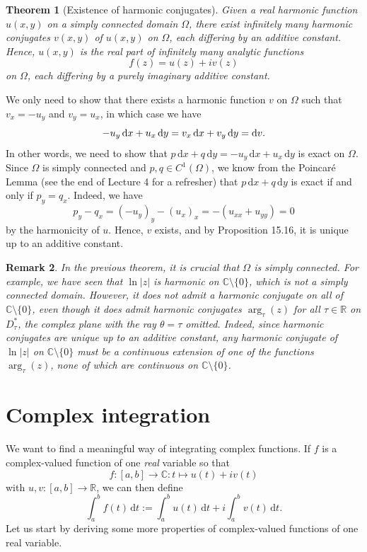 \documentclass[10pt]{article}
\makeatletter
\newcommand{\R}{\mathbb{R}}
\newcommand{\C}{\mathbb{C}}
\newcommand{\dd}{\,\mathrm{d}}
\theoremstyle{newstyle}
\newtheorem{thm}{Theorem}[section]
\newtheorem{remark}[thm]{Remark}
\newenvironment{pf}[1][\proofname]{\par
  \pushQED{\qed}%
  \normalfont \topsep0\p@\relax
  \trivlist
  \item[\hskip\labelsep\scshape
  #1\@addpunct{.}]\ignorespaces
}{%
  \popQED\endtrivlist\@endpefalse
}
\makeatother
\begin{document}
\begin{thm}[Existence of harmonic conjugates]
Given a real harmonic function $u(x, y)$ on a simply connected domain $\Omega$, there 
exist infinitely many harmonic conjugates $v(x, y)$ of $u(x, y)$ on $\Omega$, each 
differing by an additive constant. Hence, $u(x, y)$ is the real part of 
infinitely many analytic functions 
\[ f(z) = u(z) + iv(z) \]
on $\Omega$, each differing by a purely imaginary additive constant. 
\end{thm}
\begin{pf}
We only need to show that there exists a harmonic function $v$ on $\Omega$ such that 
$v_x = -u_y$ and $v_y = u_x$, in which case we have 
\[ -u_y\dd x + u_x \dd y = v_x \dd x + v_y \dd y = {\rm d}v. \]
In other words, we need to show that $p\dd x + q\dd y = -u_y\dd x + u_x \dd y$ is exact on $\Omega$. 
Since $\Omega$ is simply connected and $p, q \in C^1(\Omega)$, we know from the 
Poincar\'e Lemma (see the end of Lecture 4 for a refresher) that $p\dd x + q\dd y$ is exact 
if and only if $p_y = q_x$. Indeed, we have 
\[ p_y - q_x = (-u_y)_y - (u_x)_x = -(u_{xx} + u_{yy}) = 0 \]
by the harmonicity of $u$. Hence, $v$ exists, and by Proposition 15.16, it is unique up to 
an additive constant. 
\end{pf}

\begin{remark}
In the previous theorem, it is crucial that $\Omega$ is simply connected. For example, we have 
seen that $\ln|z|$ is harmonic on $\C \setminus \{0\}$, which is not a simply connected domain. 
However, it does not admit a harmonic conjugate on all of $\C \setminus \{0\}$, even though 
it does admit harmonic conjugates $\arg_\tau(z)$ for all $\tau \in \R$ on $D_\tau^*$, 
the complex plane with the ray $\theta = \tau$ omitted. Indeed, since harmonic conjugates 
are unique up to an additive constant, any harmonic conjugate of $\ln|z|$ on $\C \setminus \{0\}$ 
must be a continuous extension of one of the functions $\arg_\tau(z)$, none of which 
are continuous on $\C \setminus \{0\}$. 
\end{remark}

\newpage 
\section{Complex integration}

We want to find a meaningful way of integrating complex functions. If $f$ is a complex-valued 
function of one {\it real} variable so that 
\[ f : [a, b] \to \C : t \mapsto u(t) + iv(t) \]
with $u, v : [a, b] \to \R$, we can then define 
\[ \int_a^b f(t)\dd t := \int_a^b u(t)\dd t + i \int_a^b v(t)\dd t. \]
Let us start by deriving some more properties of complex-valued functions of one real variable. 
\end{document}
